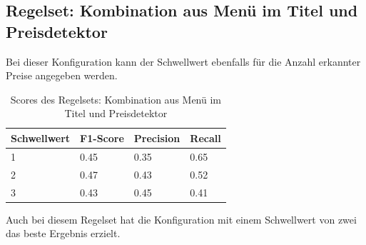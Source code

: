 \subsection{Regelset: Kombination aus Menü im Titel und Preisdetektor}
Bei dieser Konfiguration kann der Schwellwert ebenfalls für die Anzahl erkannter Preise angegeben werden.\\
\begin{table}[H]
	\caption{Scores des Regelsets: Kombination aus Menü im Titel und Preisdetektor}
	\centering
\begin{tabular}{|l|l|l|l|}
	\hline
	Schwellwert & F1-Score & Precision & Recall\\
	\hline
	1 & 0.45 & 0.35 & 0.65 \\
	2 & 0.47 & 0.43 & 0.52 \\
	3 & 0.43 & 0.45 & 0.41 \\
	\hline
\end{tabular}
\end{table}
Auch bei diesem Regelset hat die Konfiguration mit einem Schwellwert von zwei das beste Ergebnis erzielt.
